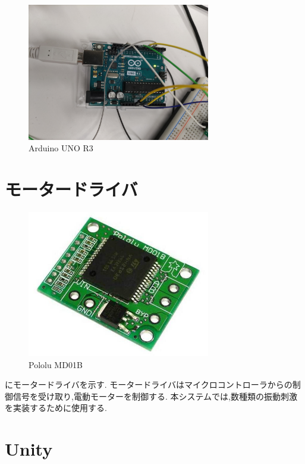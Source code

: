 \begin{figure}[h]
\centering
\includegraphics[clip,width=8cm]{./fig/Arduino.png}
\caption{Arduino UNO R3}\label{arduino}
\end{figure}

\newpage

\section{モータードライバ}

\begin{figure}[h]
\centering
\includegraphics[clip,width=8cm]{./fig/pololuMD01B.png}
\caption{Pololu MD01B}\label{polo}
\end{figure}

にモータードライバを示す.
モータードライバはマイクロコントローラからの制御信号を受け取り,電動モーターを制御する.
本システムでは,数種類の振動刺激を実装するために使用する.

\newpage

\section{Unity}

